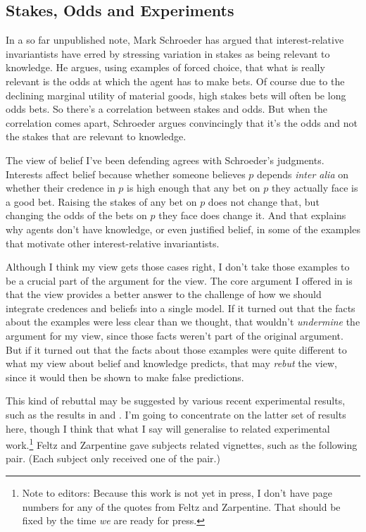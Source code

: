 \subsection{Stakes, Odds and Experiments}

In a so far unpublished note, Mark Schroeder \citeyearpar{SchroederStakes} has argued that interest-relative invariantists have erred by stressing variation in stakes as being relevant to knowledge. He argues, using examples of forced choice, that what is really relevant is the odds at which the agent has to make bets. Of course due to the declining marginal utility of material goods, high stakes bets will often be long odds bets. So there's a correlation between stakes and odds. But when the correlation comes apart, Schroeder argues convincingly that it's the odds and not the stakes that are relevant to knowledge.

The view of belief I've been defending agrees with Schroeder's judgments. Interests affect belief because  whether someone believes \(p\) depends \textit{inter alia} on whether their credence in \(p\) is high enough that any bet on \(p\) they actually face is a good bet. Raising the stakes of any bet on \(p\) does not change that, but changing the odds of the bets on \(p\) they face does change it. And that explains why agents don't have knowledge, or even justified belief, in some of the examples that motivate other interest-relative invariantists.

Although I think my view gets those cases right, I don't take those examples to be a crucial part of the argument for the view. The core argument I offered in \cite{Weatherson2005-WEACWD} is that the view provides a better answer to the challenge of how we should integrate credences and beliefs into a single model. If it turned out that the facts about the examples were less clear than we thought, that wouldn't \textit{undermine} the argument for my view, since those facts weren't part of the original argument. But if it turned out that the facts about those examples were quite different to what my view about belief and knowledge predicts, that may \textit{rebut} the view, since it would then be shown to make false predictions.

This kind of rebuttal may be suggested by various recent experimental results, such as the results in \cite{May2010} and \cite{FeltzZarpentine2010}. I'm going to concentrate on the latter set of results here, though I think that what I say will generalise to related experimental work.\footnote{Note to editors: Because this work is not yet in press, I don't have page numbers for any of the quotes from Feltz and Zarpentine. That should be fixed by the time \textit{we} are ready for press.} Feltz and Zarpentine gave subjects related vignettes, such as the following pair. (Each subject only received one of the pair.)

